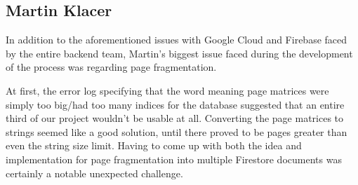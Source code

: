 \subsection{Martin Klacer}

In addition to the aforementioned issues with Google Cloud and Firebase faced by the entire backend team, Martin's biggest issue faced during the development of the process was regarding page fragmentation. 

At first, the error log specifying that the word meaning page matrices were simply too big/had too many indices for the database suggested that an entire third of our project wouldn't be usable at all. Converting the page matrices to strings seemed like a good solution, until there proved to be pages greater than even the string size limit. Having to come up with both the idea and implementation for page fragmentation into multiple Firestore documents was certainly a notable unexpected challenge.
